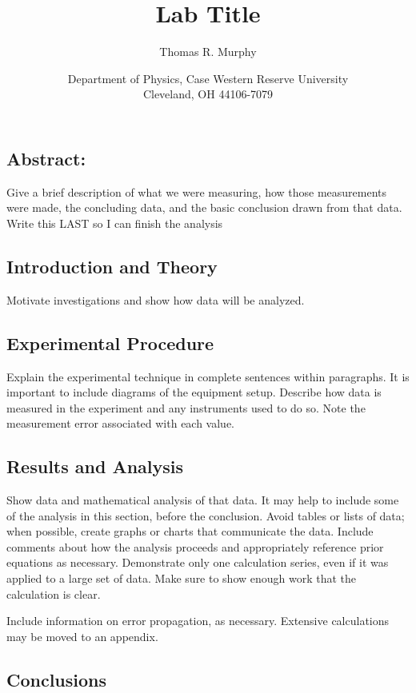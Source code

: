 \documentclass[letterpaper, 12pt]{article}
\title{Lab Title}
\author{Thomas R. Murphy}
\date{Department of Physics, Case Western Reserve University \\ Cleveland, OH 44106-7079}
\begin{document}
\maketitle

	\subsection*{Abstract:}
	
		Give a brief description of what we were measuring, how those measurements were made, the concluding data, and the basic conclusion drawn from that data. Write this LAST so I can finish the analysis
	
	\subsection*{Introduction and Theory}
	
		Motivate investigations and show how data will be analyzed.
	
	\subsection*{Experimental Procedure}
	
		Explain the experimental technique in complete sentences within paragraphs. It is important to include diagrams of the equipment setup. Describe how data is measured in the experiment and any instruments used to do so. Note the measurement error associated with each value.
	
	\subsection*{Results and Analysis}
	
		Show data and mathematical analysis of that data. It may help to include some of the analysis in this section, before the conclusion. Avoid tables or lists of data; when possible, create graphs or charts that communicate the data. Include comments about how the analysis proceeds and appropriately reference prior equations as necessary. Demonstrate only one calculation series, even if it was applied to a large set of data. Make sure to show enough work that the calculation is clear. 
		
		Include information on error propagation, as necessary. Extensive calculations may be moved to an appendix. 
	
	\subsection*{Conclusions}
	
\end{document}
